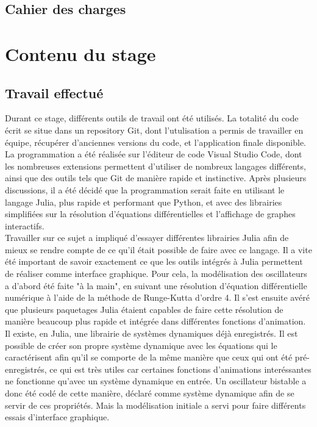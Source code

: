 \documentclass[a4paper, french, 12pt, titlepage]{article}
\begin{document}
\subsection{Cahier des charges}

\newpage 

\section{Contenu du stage}


\subsection{Travail effectué}


Durant ce stage, différents outils de travail ont été utilisés. La totalité du code écrit se situe dans un repository Git, dont l'utulisation a permis de travailler en équipe, récupérer d'anciennes versions du code, et l'application finale disponible. La programmation a été réalisée sur l'éditeur de code Visual Studio Code, dont les nombreuses extensions permettent d'utiliser de nombreux langages différents, ainsi que des outils tels que Git de manière rapide et instinctive. Après plusieurs discussions, il a été décidé que la programmation serait faite en utilisant le langage Julia, plus rapide et performant que Python, et avec des librairies simplifiées sur la résolution d'équations différentielles et l'affichage de graphes interactifs. \\

Travailler sur ce sujet a impliqué d'essayer différentes librairies Julia afin de mieux se rendre compte de ce qu'il était possible de faire avec ce langage. Il a vite été important de savoir exactement ce que les outils intégrés à Julia permettent de réaliser comme interface graphique. Pour cela, la modélisation des oscillateurs a d'abord été faite "à la main", en suivant une résolution d'équation différentielle numérique à l'aide de la méthode de Runge-Kutta d'ordre 4. Il s'est ensuite avéré que plusieurs paquetages Julia étaient capables de faire cette résolution de manière beaucoup plus rapide et intégrée dans différentes fonctions d'animation. Il existe, en Julia, une librairie de systèmes dynamiques déjà enregistrés. Il est possible de créer son propre système dynamique avec les équations qui le caractérisent afin qu'il se comporte de la même manière que ceux qui ont été pré-enregistrés, ce qui est très utiles car certaines fonctions d'animations interéssantes ne fonctionne qu'avec un système dynamique en entrée. Un oscillateur bistable a donc été codé de cette manière, déclaré comme système dynamique afin de se servir de ces propriétés. Mais la modélisation initiale a servi pour faire différents essais d'interface graphique. \\
\end{document}
